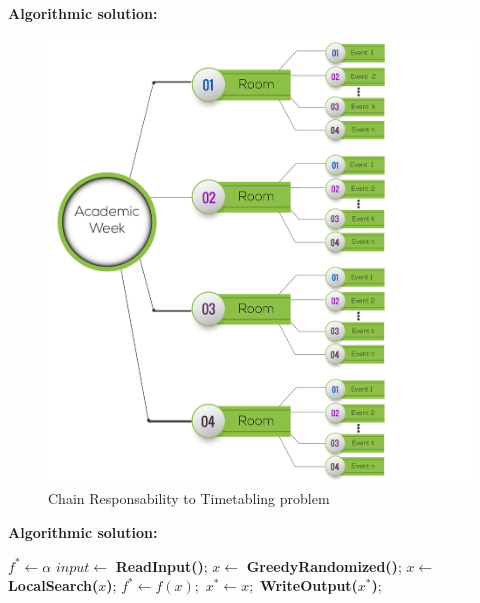 \documentclass[centering]{report}
\newenvironment{slide}
    {\newpage
    \vspace*{\fill}
    }
    { 
     \vspace*{\fill}
    }
\begin{document}
\begin{slide}
\textbf{Algorithmic solution:}\\

\begin{figure}[h!]
  \centering
  \includegraphics[width=0.65\linewidth]{images/chainresponsability.png}
  \caption{\label{fig:methodologyflow2}Chain Responsability to Timetabling problem}
\end{figure}
\end{slide}

\begin{slide}
\textbf{Algorithmic solution:}\\

{\huge
  \begin{algorithmic}[1]
    \State $f^* \gets \alpha $
    \State $input \gets $ \textbf{ReadInput()};
        \State $x\gets $ \textbf{GreedyRandomized()};
        \State $x\gets $ \textbf{LocalSearch($x$)};
          \State $f^*\gets f(x);$
          \State $x^*\gets x;$
        \EndIf    
      \EndFor
    \EndIf
    \State \textbf{WriteOutput($x^*$)};%
    \EndProcedure
  \end{algorithmic}
}
\end{slide}
\end{document}
